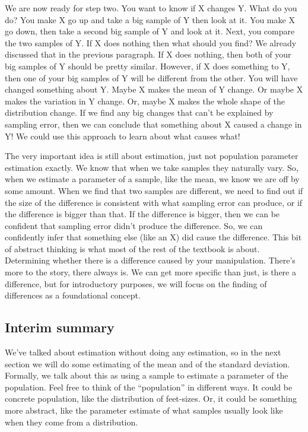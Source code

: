 \documentclass[
]{book}
\begin{document}
We are now ready for step two. You want to know if X changes Y. What do you do? You make X go up and take a big sample of Y then look at it. You make X go down, then take a second big sample of Y and look at it. Next, you compare the two samples of Y. If X does nothing then what should you find? We already discussed that in the previous paragraph. If X does nothing, then both of your big samples of Y should be pretty similar. However, if X does something to Y, then one of your big samples of Y will be different from the other. You will have changed something about Y. Maybe X makes the mean of Y change. Or maybe X makes the variation in Y change. Or, maybe X makes the whole shape of the distribution change. If we find any big changes that can't be explained by sampling error, then we can conclude that something about X caused a change in Y! We could use this approach to learn about what causes what!

The very important idea is still about estimation, just not population parameter estimation exactly. We know that when we take samples they naturally vary. So, when we estimate a parameter of a sample, like the mean, we know we are off by some amount. When we find that two samples are different, we need to find out if the size of the difference is consistent with what sampling error can produce, or if the difference is bigger than that. If the difference is bigger, then we can be confident that sampling error didn't produce the difference. So, we can confidently infer that something else (like an X) did cause the difference. This bit of abstract thinking is what most of the rest of the textbook is about. Determining whether there is a difference caused by your manipulation. There's more to the story, there always is. We can get more specific than just, is there a difference, but for introductory purposes, we will focus on the finding of differences as a foundational concept.

\hypertarget{interim-summary}{%
\subsection{Interim summary}\label{interim-summary}}

We've talked about estimation without doing any estimation, so in the next section we will do some estimating of the mean and of the standard deviation. Formally, we talk about this as using a sample to estimate a parameter of the population. Feel free to think of the ``population'' in different ways. It could be concrete population, like the distribution of feet-sizes. Or, it could be something more abstract, like the parameter estimate of what samples usually look like when they come from a distribution.
\end{document}

